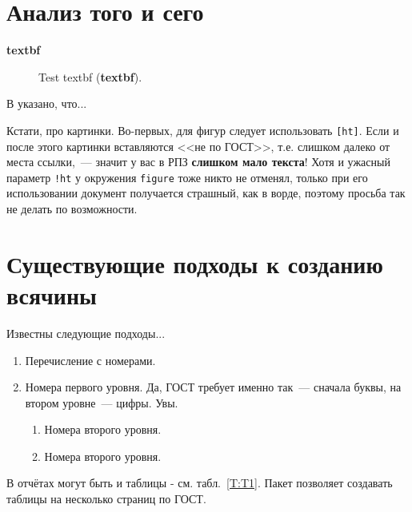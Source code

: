 \documentclass[utf8]{G7-32} %
\begin{document}
\section{Анализ того и сего}

\textbf{textbf}

\begin{figure}
\centering
\caption{Test textbf (\textbf{textbf}).}
\label{fig:dia}
\end{figure}


В \cite{Pup99} указано, что...

Кстати, про картинки. Во-первых, для фигур следует использовать \texttt{[ht]}. Если и после этого картинки вставляются <<не по ГОСТ>>, т.е. слишком далеко от места ссылки,~--- значит у вас в РПЗ \textbf{слишком мало текста}! Хотя и ужасный параметр \texttt{!ht} у окружения \texttt{figure} тоже никто не отменял, только при его использовании документ получается страшный, как в ворде, поэтому просьба так не делать по возможности.


\section{Существующие подходы к созданию всячины}

Известны следующие подходы...

\begin{enumerate}
\item Перечисление с номерами.
\item Номера первого уровня. Да, ГОСТ требует именно так~--- сначала буквы, на втором уровне~--- цифры. Увы.
\begin{enumerate} 
\item Номера второго уровня.
\item Номера второго уровня.
\end{enumerate}
\end{enumerate}


В отчётах могут быть и таблицы - см. табл.~\ref{T:T1}. Пакет  позволяет создавать таблицы на несколько страниц по ГОСТ.
\end{document}
